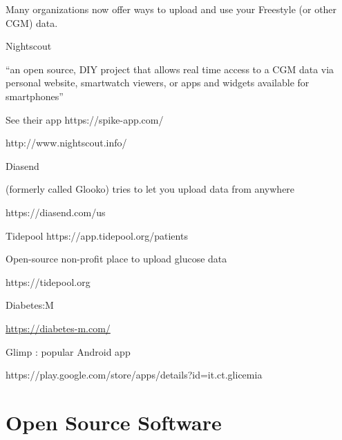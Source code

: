 \documentclass[
]{book}
\begin{document}
Many organizations now offer ways to upload and use your Freestyle (or other CGM) data.

Nightscout

``an open source, DIY project that allows real time access to a CGM data via personal website, smartwatch viewers, or apps and widgets available for smartphones''

See their app https://spike-app.com/

http://www.nightscout.info/

Diasend

(formerly called Glooko) tries to let you upload data from anywhere

https://diasend.com/us

Tidepool https://app.tidepool.org/patients

Open-source non-profit place to upload glucose data

https://tidepool.org

Diabetes:M

\url{https://diabetes-m.com/}

Glimp : popular Android app

https://play.google.com/store/apps/details?id=it.ct.glicemia

\hypertarget{open-source-software}{%
\chapter{Open Source Software}\label{open-source-software}}
\end{document}
